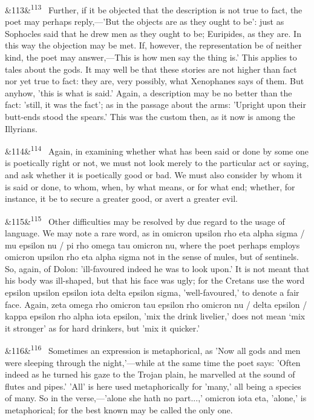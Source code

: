 \documentclass[12pt]{article}
\newcommand{\para}[1][]{\par\noindent\ifx&#1&\else\textsuperscript{\footnotesize #1}~\fi}
\begin{document}
{\para[113] Further, if it be objected that the description is not true to fact, the poet may perhaps reply,---'But the objects are as they ought to be': just as Sophocles said that he drew men as they ought to be; Euripides, as they are. In this way the objection may be met. If, however, the representation be of neither kind, the poet may answer,---This is how men say the thing is.' This applies to tales about the gods. It may well be that these stories are not higher than fact nor yet true to fact: they are, very possibly, what Xenophanes says of them. But anyhow, 'this is what is said.' Again, a description may be no better than the fact: 'still, it was the fact'; as in the passage about the arms: 'Upright upon their butt-ends stood the spears.' This was the custom then, as it now is among the Illyrians.

\para[114] Again, in examining whether what has been said or done by some one is poetically right or not, we must not look merely to the particular act or saying, and ask whether it is poetically good or bad. We must also consider by whom it is said or done, to whom, when, by what means, or for what end; whether, for instance, it be to secure a greater good, or avert a greater evil.

\para[115] Other difficulties may be resolved by due regard to the usage of language. We may note a rare word, as in {omicron upsilon rho eta alpha sigma / mu epsilon nu / pi rho omega tau omicron nu}, where the poet perhaps employs {omicron upsilon rho eta alpha sigma} not in the sense of mules, but of sentinels. So, again, of Dolon: 'ill-favoured indeed he was to look upon.' It is not meant that his body was ill-shaped, but that his face was ugly; for the Cretans use the word {epsilon upsilon epsilon iota delta epsilon sigma}, 'well-favoured,' to denote a fair face. Again, {zeta omega rho omicron tau epsilon rho omicron nu / delta epsilon / kappa epsilon rho alpha iota epsilon}, 'mix the drink livelier,' does not mean `mix it stronger' as for hard drinkers, but 'mix it quicker.'

\para[116] Sometimes an expression is metaphorical, as 'Now all gods and men were sleeping through the night,'---while at the same time the poet says: 'Often indeed as he turned his gaze to the Trojan plain, he marvelled at the sound of flutes and pipes.' 'All' is here used metaphorically for 'many,' all being a species of many. So in the verse,---'alone she hath no part...,' {omicron iota eta}, 'alone,' is metaphorical; for the best known may be called the only one.

}
\end{document}
